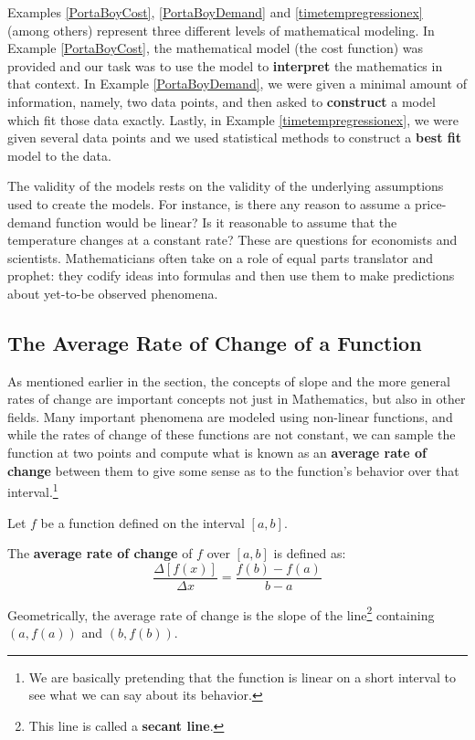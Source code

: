 \documentclass{ximera}
\begin{document}
Examples \ref{PortaBoyCost}, \ref{PortaBoyDemand} and \ref{timetempregressionex} (among others)  represent three different levels of mathematical modeling.  In Example  \ref{PortaBoyCost},  the mathematical model (the cost function) was provided and our task was to use the model to \textbf{interpret} the mathematics in that context.    In Example  \ref{PortaBoyDemand}, we were given a minimal amount of information, namely, two data points, and then asked to \textbf{construct} a model which fit those data exactly.  Lastly, in Example \ref{timetempregressionex}, we were given several data points and we used statistical methods to construct a \textbf{best fit} model to the data. 



The validity of the models rests on the validity of the underlying assumptions used to create the models.  For instance, is there any reason to assume a price-demand function would be linear?  Is it reasonable to assume that the temperature changes at a constant rate? These are questions for economists and scientists.  Mathematicians often take on a role of equal parts translator and prophet:  they codify ideas into formulas and then use them to make predictions about yet-to-be observed phenomena.  


\subsection{The Average Rate of Change of a Function}
\label{AverageRateofChange}

As mentioned earlier in the section, the concepts of slope and the more general rates of change are important concepts not just in Mathematics, but also in other fields.   Many important phenomena are modeled using non-linear functions, and while the rates of change of these functions are not constant, we can sample the function at two points and compute what is known as an \textbf{average rate of change} between them to give some sense as to the function's behavior over that interval.\footnote{We are basically pretending that the function is linear on a short interval to see what we can say about its behavior.}




\begin{definition} \label{arc}  Let $f$ be a function defined on the interval $[a,b]$. 

\smallskip

 The \textbf{average rate of change}  of $f$ over $[a,b]$ is defined as: \[ \dfrac{\Delta [f(x)]}{\Delta x} = \dfrac{f(b) - f(a)}{b-a} \]

Geometrically, the average rate of change is the slope of the line\footnote{This line is called a \textbf{secant line}.}  containing $(a, f(a))$ and $(b, f(b))$.

\end{definition}
\end{document}
